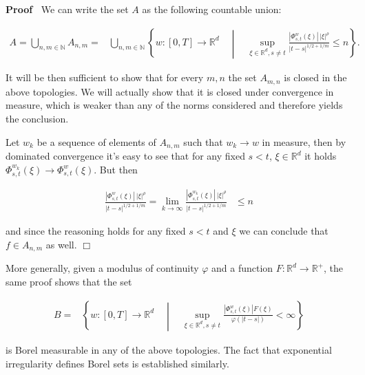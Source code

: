 \documentclass[10pt]{article}
\newenvironment{proof}{\noindent\textbf{Proof\ }}{\hspace*{\fill}$\Box$\medskip}
\begin{document}
\begin{proof}
  We can write the set $A$ as the following countable union:
  
  \begin{align}
    A = \bigcup_{n, m \in \mathbb{N}} A_{n, m} = & \bigcup_{n, m \in
    \mathbb{N}} \left\{ w : [0, T] \rightarrow \mathbb{R}^d \hspace{1em}
    \middle| \hspace{1em} \sup_{\xi \in \mathbb{R}^d, s \neq t} \frac{|
    \Phi^w_{s, t} (\xi) | \, | \xi |^{\rho}}{| t - s |^{1 / 2 + 1 / m}}
    \leqslant n \right\} .
  \end{align}
  
  It will be then sufficient to show that for every $m, n$ the set $A_{m, n}$
  is closed in the above topologies. We will actually show that it is closed
  under convergence in measure, which is weaker than any of the norms
  considered and therefore yields the conclusion.
  
  Let $w_k$ be a sequence of elements of $A_{n, m}$ such that $w_k \rightarrow
  w$ in measure, then by dominated convergence it's easy to see that for any
  fixed $s < t$, $\xi \in \mathbb{R}^d$ it holds $\Phi^{w_k}_{s, t} (\xi)
  \rightarrow \Phi^w_{s, t} (\xi)$. But then
  
  \begin{align}
    \frac{| \Phi^w_{s, t} (\xi) | \, | \xi |^{\rho}}{| t - s |^{1 / 2 + 1 /
    m}} = \lim_{k \rightarrow \infty} \frac{| \Phi^{w_k}_{s, t} (\xi) | \, |
    \xi |^{\rho}}{| t - s |^{1 / 2 + 1 / m}} & \leqslant n
  \end{align}
  
  and since the reasoning holds for any fixed $s < t$ and $\xi$ we can
  conclude that $f \in A_{n, m}$ as well.
\end{proof}

\begin{remark}
  \label{sec2.2 lemma borel general}More generally, given a modulus of
  continuity $\varphi$ and a function $F : \mathbb{R}^d \rightarrow
  \mathbb{R}^+$, the same proof shows that the set
  
  \begin{align}
    B = & \left\{ w : [0, T] \rightarrow \mathbb{R}^d \hspace{1em} \middle|
    \hspace{1em} \sup_{\xi \in \mathbb{R}^d, s \neq t} \frac{| \Phi^w_{s, t}
    (\xi) | F (\xi)}{\varphi (| t - s |)} < \infty \right\}
  \end{align}
  
  is Borel measurable in any of the above topologies. The fact that
  exponential irregularity defines Borel sets is established similarly.
\end{remark}
\end{document}
